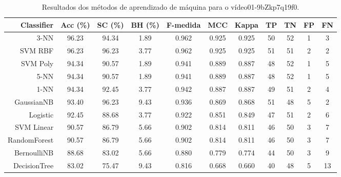 \begin{table}[!htb]
\centering
\caption{Resultados dos métodos de aprendizado de máquina para o vídeo01-9bZkp7q19f0.}
\label{tab:01-9bZkp7q19f0}
\begin{tabular}{r|c|c|c|c|c|c|c|c|c|c}
\hline\hline
Classifier & Acc (\%) & SC (\%) & BH (\%) & F-medida & MCC & Kappa & TP & TN & FP & FN \\ \hline
3-NN & 96.23 & 94.34 & 1.89 & 0.962 & 0.925 & 0.925 & 50 & 52 & 1 & 3 \\ 
SVM RBF & 96.23 & 96.23 & 3.77 & 0.962 & 0.925 & 0.925 & 51 & 51 & 2 & 2 \\ 
SVM Poly & 94.34 & 90.57 & 1.89 & 0.941 & 0.889 & 0.887 & 48 & 52 & 1 & 5 \\ 
5-NN & 94.34 & 90.57 & 1.89 & 0.941 & 0.889 & 0.887 & 48 & 52 & 1 & 5 \\ 
1-NN & 94.34 & 92.45 & 3.77 & 0.942 & 0.887 & 0.887 & 49 & 51 & 2 & 4 \\ 
GaussianNB & 93.40 & 96.23 & 9.43 & 0.936 & 0.869 & 0.868 & 51 & 48 & 5 & 2 \\ 
Logistic & 92.45 & 88.68 & 3.77 & 0.922 & 0.851 & 0.849 & 47 & 51 & 2 & 6 \\ 
SVM Linear & 90.57 & 86.79 & 5.66 & 0.902 & 0.814 & 0.811 & 46 & 50 & 3 & 7 \\ 
RandomForest & 90.57 & 86.79 & 5.66 & 0.902 & 0.814 & 0.811 & 46 & 50 & 3 & 7 \\ 
BernoulliNB & 88.68 & 83.02 & 5.66 & 0.880 & 0.779 & 0.774 & 44 & 50 & 3 & 9 \\ 
DecisionTree & 83.02 & 75.47 & 9.43 & 0.816 & 0.668 & 0.660 & 40 & 48 & 5 & 13 \\ 
\hline\hline
\end{tabular}
\end{table}
